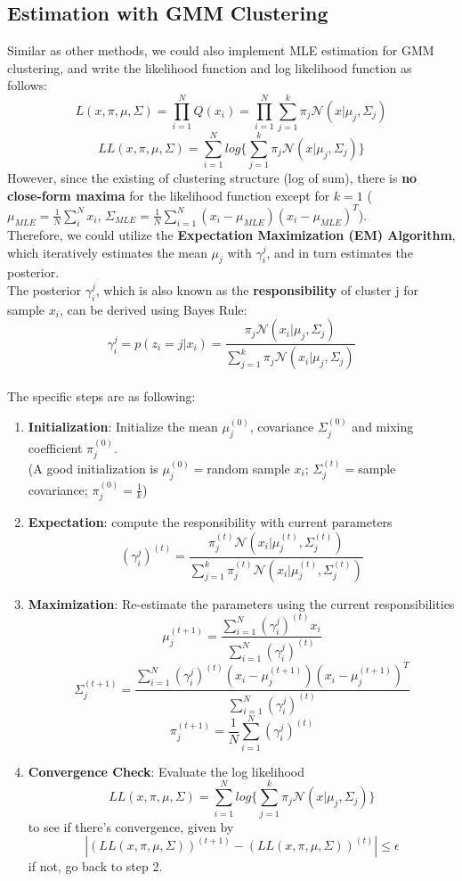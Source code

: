 \documentclass{article}
\begin{document}
\subsection{Estimation with GMM Clustering}
Similar as other methods, we could also implement MLE estimation for GMM clustering, and write the likelihood function and log likelihood function as follows:\[
L(x,\pi,\mu,\Sigma)=\prod_{i=1}^{N}Q(x_i)=\prod_{i=1}^{N}\sum_{j=1}^{k}\pi_{j}\mathcal{N}(x|\mu_{j},\Sigma_{j})
\]
\[
LL(x,\pi,\mu,\Sigma)=\sum_{i=1}^{N}log\{\sum_{j=1}^{k}\pi_{j}\mathcal{N}(x|\mu_{j},\Sigma_{j})\}\]
However, since the existing of clustering structure (log of sum), there is \textbf{no close-form maxima} for the likelihood function except for $k=1$ ($\mu_{MLE}=\frac{1}{N}\sum_{i}^{N}x_i$, $\Sigma_{MLE}=\frac{1}{N}\sum_{i=1}^{N}(x_i-\mu_{MLE})(x_i-\mu_{MLE})^{T}$).\\
Therefore, we could utilize the \textbf{Expectation Maximization (EM) Algorithm}, which iteratively estimates the mean $\mu_j$ with $\gamma_i^{j}$, and in turn estimates the posterior.\\
The posterior $\gamma_i^{j}$, which is also known as the \textbf{responsibility} of cluster j for sample $x_i$, can be derived using Bayes Rule:\[
\gamma_i^{j}=p(z_i=j|x_i)=\frac{\pi_j\mathcal{N}(x_i|\mu_j,\Sigma_j)}{\sum_{j=1}^{k}\pi_j\mathcal{N}(x_i|\mu_j,\Sigma_j)}
\]\\
The specific steps are as following:
\begin{enumerate}
    \item \textbf{Initialization}: Initialize the mean $\mu_j^{(0)}$, covariance $\Sigma_j^{(0)}$ and mixing coefficient $\pi_j^{(0)}$.\\ (A good initialization is $\mu_j^{(0)} = $random sample $x_i$; $\Sigma_j^(t)=$sample covariance; $\pi_j^{(0)}=\frac{1}{k}$)
    \item \textbf{Expectation}: compute the responsibility with current parameters\[
    (\gamma_i^j)^{(t)}=\frac{\pi_j^{(t)}\mathcal{N}(x_i|\mu_j^{(t)},\Sigma_j^{(t)})}{\sum_{j=1}^{k}\pi_j^{(t)}\mathcal{N}(x_i|\mu_j^{(t)},\Sigma_j^{(t)})}
    \]
    \item \textbf{Maximization}: Re-estimate the parameters using the current responsibilities\[
    \mu_j^{(t+1)}=\frac{\sum_{i=1}^{N}(\gamma_i^{j})^{(t)}x_i}{\sum_{i=1}^{N}(\gamma_{i}^{j})^{(t)}}
    \]
    \[
    \Sigma_j^{(t+1)}=\frac{\sum_{i=1}^{N}(\gamma_i^{j})^{(t)}(x_i-\mu_j^{(t+1)})(x_i-\mu_j^{(t+1)})^{T}}{\sum_{i=1}^{N}(\gamma_i^{j})^{(t)}}
    \]
    \[
    \pi_j^{(t+1)}=\frac{1}{N}\sum_{i=1}^{N}(\gamma_i^{j})^{(t)}
    \]
    \item \textbf{Convergence Check}: Evaluate the log likelihood\[
    LL(x,\pi,\mu,\Sigma)=\sum_{i=1}^{N}log\{\sum_{j=1}^{k}\pi_{j}\mathcal{N}(x|\mu_{j},\Sigma_{j})\}
    \] to see if there's convergence, given by\[
    |(LL(x,\pi,\mu,\Sigma))^{(t+1)} - (LL(x,\pi,\mu,\Sigma))^{(t)}| \leq \epsilon
    \]if not, go back to step 2.
\end{enumerate}
\end{document}
